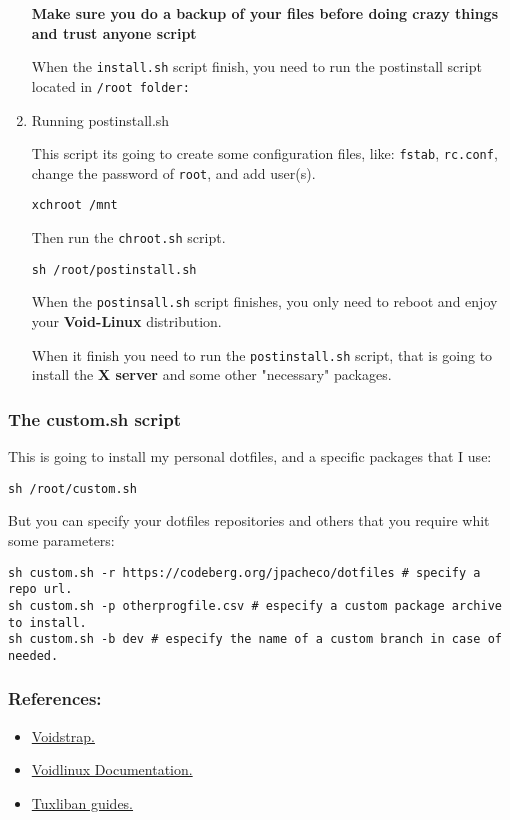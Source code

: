 \documentclass[11pt]{article}
\begin{document}
\begin{enumerate}
\textbf{Make sure you do a backup of your files before doing crazy things and trust anyone script}

When the \texttt{install.sh} script finish, you need to run the postinstall script located in \texttt{/root folder:}
\item Running postinstall.sh
\label{sec:org34d56e4}

This script its going to create some configuration files, like: \texttt{fstab}, \texttt{rc.conf},
change the password of \texttt{root}, and add user(s).

\begin{verbatim}
xchroot /mnt
\end{verbatim}

Then run the \texttt{chroot.sh} script.
\begin{verbatim}
sh /root/postinstall.sh
\end{verbatim}

When the \texttt{postinsall.sh} script finishes, you only need to reboot and enjoy your
\textbf{Void-Linux} distribution.

When it finish you need to run the \texttt{postinstall.sh} script, that is going to install
the \textbf{X server} and some other "necessary" packages.
\end{enumerate}
\subsubsection{The custom.sh script}
\label{sec:org0836278}

This is going to install my personal dotfiles, and a specific packages that I use:
\begin{verbatim}
sh /root/custom.sh
\end{verbatim}

But you can specify your dotfiles repositories and others that you require whit some parameters:

\begin{verbatim}
sh custom.sh -r https://codeberg.org/jpacheco/dotfiles # specify a repo url.
sh custom.sh -p otherprogfile.csv # especify a custom package archive to install.
sh custom.sh -b dev # especify the name of a custom branch in case of needed.
\end{verbatim}
\subsubsection{References:}
\label{sec:org558d03c}
\begin{itemize}
\item \href{https://codeberg.org/jpacheco/voidstrap}{Voidstrap.}
\item \href{https://docs.voidlinux.org/}{Voidlinux Documentation.}
\item \href{https://git.disroot.org/tuxliban/tutoriales\_void/src/branch/master/Gu\%C3\%ADas}{Tuxliban guides.}
\end{itemize}
\end{document}
